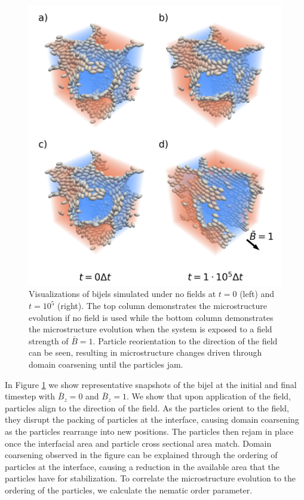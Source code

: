 \begin{figure} 
    \centering 
    \includegraphics[scale=0.7]{../figures/results/paper2/microstructure_viz-field_on.png} 
    \caption{Visualizations of bijels simulated under no fields at $t = 0$ (left) and $t = 10^5$ (right). The top 
            column demonstrates the microstructure evolution if no field is used while the bottom column demonstrates 
            the microstructure evolution when the system is exposed to a field strength of $\bar{B} = 1$. Particle 
            reorientation to the direction of the field can be seen, resulting in microstructure changes driven 
            through domain coarsening until the particles jam.} 
    \label{fig:microstructure_viz-field_on} 
\end{figure}

In Figure \ref{fig:microstructure_viz-field_on} we show representative snapshots of the bijel at the initial and 
final timestep with $\bar{B}_z = 0$ and $\bar{B}_z = 1$. We show that upon application of the field, particles align 
to the direction of the field. As the particles orient to the field, they disrupt the packing of particles at the 
interface, causing domain coarsening as the particles rearrange into new positions. The particles then rejam in 
place once the interfacial area and particle cross sectional area match. Domain coarsening observed in the figure 
can be explained through the ordering of particles at the interface, causing a reduction in the available area that 
the particles have for stabilization. To correlate the microstructure evolution to the ordering of the particles, we calculate the 
nematic order parameter. \cite{cuesta_monte_1990} 

